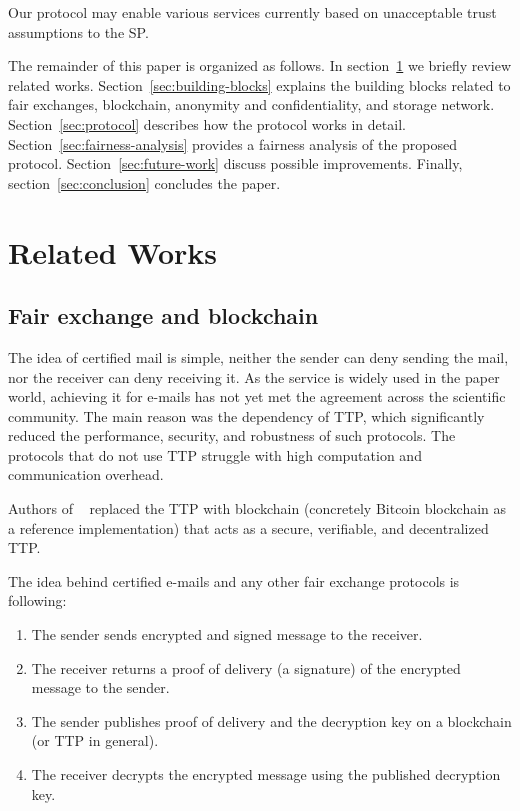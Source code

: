 \documentclass{ieeeaccess}
\begin{document}
Our protocol may enable various services currently based on unacceptable trust assumptions to the SP.

The remainder of this paper is organized as follows.
In section~\ref{sec:related-works} we briefly review related works. 
Section~\ref{sec:building-blocks} explains the building blocks related to fair exchanges, blockchain, anonymity and confidentiality, and storage network. 
Section~\ref{sec:protocol} describes how the protocol works in detail.
Section~\ref{sec:fairness-analysis} provides a fairness analysis of the proposed protocol.
Section~\ref{sec:future-work} discuss possible improvements. 
Finally, section~\ref{sec:conclusion} concludes the paper.


\section{Related Works}\label{sec:related-works}

\subsection{Fair exchange and blockchain}
The idea of certified mail is simple, neither the sender can deny sending the mail, nor the receiver can deny receiving it. As the service is widely used in the paper world, achieving it for e-mails has not yet met the agreement across the scientific community. The main reason was the dependency of TTP, which significantly reduced the performance, security, and robustness of such protocols. The protocols that do not use TTP struggle with high computation and communication overhead.

Authors of ~\cite{hinarejos2019solution} replaced the TTP with blockchain (concretely Bitcoin blockchain as a reference implementation) that acts as a secure, verifiable, and decentralized TTP.

The idea behind certified e-mails and any other fair exchange protocols is following:
\begin{enumerate}
    \item The sender sends encrypted and signed message to the receiver.
    \item The receiver returns a proof of delivery (a signature) of the encrypted message to the sender.
    \item The sender publishes proof of delivery and the decryption key on a blockchain (or TTP in general).
    \item The receiver decrypts the encrypted message using the published decryption key.
\end{enumerate}
\end{document}
